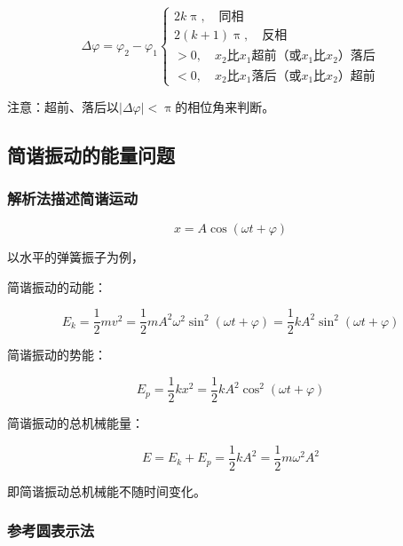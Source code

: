 \documentclass[12pt, a4paper]{article}
\numberwithin{equation}{section}
\begin{document}
    $$
    \Delta \varphi=\varphi_2-\varphi_1\left\{\begin{array}{l}
        2 k \uppi, \quad \text{同相} \\
        2(k+1) \uppi, \quad \text{反相} \\
        >0, \quad \text{\(x_2\)比\(x_1\)超前（或\(x_1\)比\(x_2\)）落后} \\
        < 0, \quad \text{\(x_2\)比\(x_1\)落后（或\(x_1\)比\(x_2\)）超前}
        \end{array}\right.
    $$

    注意：超前、落后以\(\left|\Delta \varphi\right| < \uppi\)的相位角来判断。

\subsection{简谐振动的能量问题}

\subsubsection{解析法描述简谐运动}

    \[
        x = A \cos \left(\omega t + \varphi\right)
    \]

    以水平的弹簧振子为例，

    简谐振动的动能：

    \begin{equation}
        E_k=\frac{1}{2} m v^2 =\frac{1}{2} m A^2 \omega^2 \sin ^2(\omega t+\varphi)
        =\frac{1}{2} k A^2 \sin ^2(\omega t+\varphi)
    \end{equation}

    简谐振动的势能：

    \begin{equation}
        E_p=\frac{1}{2} k x^2=\frac{1}{2} k A^2 \cos ^2(\omega t+\varphi)
    \end{equation}

    简谐振动的总机械能量：

    \begin{equation}
        E=E_k+E_p=\frac{1}{2} k A^2=\frac{1}{2} m \omega^2 A^2
    \end{equation}

    即简谐振动总机械能不随时间变化。

\subsubsection{参考圆表示法}
\end{document}
